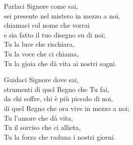 

\spazio

\strofa Parlaci Signore come sai,\\
sei presente nel mistero in mezzo a noi,\\
chiamaci col nome che vorrai\\
e sia fatto il tuo disegno su di noi;\\
Tu la luce che rischiara,\\
Tu la voce che ci chiama,\\
Tu la gioia che dà vita ai nostri sogni.

\spazio


\spazio

\strofa Guidaci Signore dove sai,\\
strumenti di quel Regno che Tu fai,\\
da chi soffre, chi è più piccolo di noi,\\
di quel Regno che ora vive in mezzo a noi;\\
Tu l'amore che dà vita,\\
Tu il sorriso che ci allieta,\\
Tu la forza che raduna i nostri giorni.

\spazio

